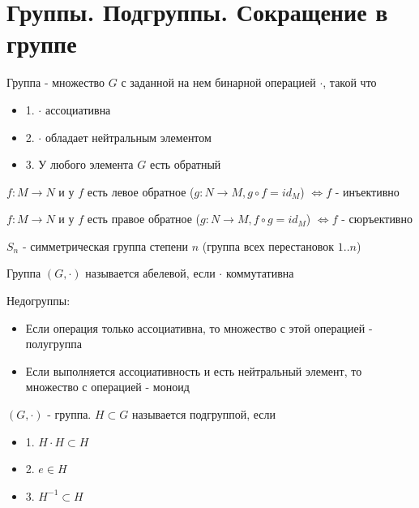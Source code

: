 \section{Группы. Подгруппы. Сокращение в группе}
\begin{conj}
    Группа - множество $G$ с заданной на нем бинарной операцией $\cdot$, такой что
    \begin{itemize}
    \item[] 1. $\cdot$ ассоциативна
    \item[] 2. $\cdot$ обладает нейтральным элементом
    \item[] 3. У любого элемента $G$ есть обратный
    \end{itemize}
\end{conj}


\begin{theorem-non}
$f: M \to N$ и у $f$ есть левое обратное ($g: N \to M, g \circ f = id_M$) $\Leftrightarrow f$ - инъективно

$f: M \to N$ и у $f$ есть правое обратное ($g: N \to M, f\circ g = id_M$) $\Leftrightarrow f$ - сюръективно
\end{theorem-non}

\begin{conj}
    $S_n$ - симметрическая группа степени $n$ (группа всех перестановок $1..n$)
\end{conj}
\begin{conj}
    Группа $(G, \cdot)$ называется абелевой, если $\cdot$ коммутативна
\end{conj}
Недогруппы:
\begin{itemize}
    \item[] Если операция только ассоциативна, то множество с этой операцией - полугруппа
    \item[] Если выполняется ассоциативность и есть нейтральный элемент, то множество с операцией - моноид
\end{itemize}
\begin{conj}
    $(G, \cdot)$ - группа. $H \subset G$ называется подгруппой, если
    \begin{itemize}
    \item[] 1. $H\cdot H \subset H$
    \item[] 2. $e \in H$
    \item[] 3. $H^{-1} \subset H$
    \end{itemize}
\end{conj}